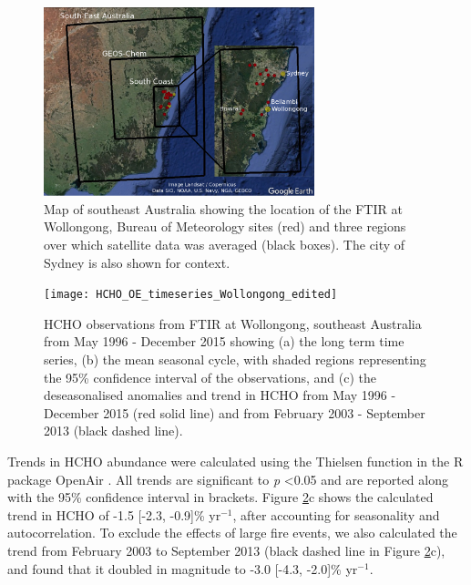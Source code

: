 \documentclass[draft,linenumbers]{AGUJournal}
\begin{document}
\begin{figure}[h!]
  \begin{center}
    \includegraphics[width=0.7\textwidth]{Wollongong_region_map}
      \caption{Map of southeast Australia showing the location of the FTIR at Wollongong,  Bureau of Meteorology sites (red) and three regions over which satellite data was averaged (black boxes). The city of Sydney is also shown for context.}
  \label{fig:map}
  \end{center}
\end{figure}

\begin{figure}[h!]
  \begin{center}
    \texttt{[image: HCHO\_OE\_timeseries\_Wollongong\_edited]}
      \caption{HCHO observations from FTIR at Wollongong, southeast Australia from May 1996 - December 2015 showing (a) the long term time series, (b) the mean seasonal cycle, with shaded regions representing the 95\% confidence interval of the observations, and (c) the deseasonalised anomalies and trend in HCHO from May 1996 - December 2015 (red solid line) and from February 2003 - September 2013 (black dashed line).}
  \label{fig:hcho_ts}
  \end{center}
\end{figure}

Trends in HCHO abundance were calculated using the Thielsen function in the R package OpenAir \citep{Carslaw2012}. All trends are significant to \textit{p} \textless 0.05 and are reported along with the 95\% confidence interval in brackets. Figure \ref{fig:hcho_ts}c shows the calculated trend in HCHO of -1.5 [-2.3, -0.9]\% yr$^{-1}$, after accounting for seasonality and autocorrelation. To exclude the effects of large fire events, we also calculated the trend from February 2003 to September 2013 (black dashed line in Figure \ref{fig:hcho_ts}c), and found that it doubled in magnitude to -3.0 [-4.3, -2.0]\% yr$^{-1}$.
\end{document}
